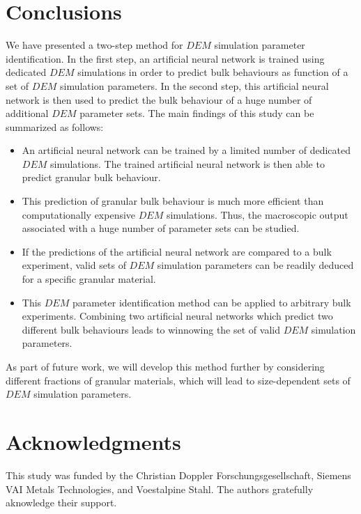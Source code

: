 \documentclass{llncs}
\begin{document}
\section{Conclusions}
\label{sec:conclusions}
We have presented a two-step method for $DEM$ simulation parameter
identification. In the first step, an artificial neural network is 
trained using dedicated $DEM$ simulations in order to predict bulk 
behaviours as function of a set of $DEM$ simulation parameters. 
In the second step, this artificial neural network is then used 
to predict the bulk behaviour of a huge number of additional $DEM$ parameter
sets.
The main findings of this study can be summarized as follows:
\begin{itemize}
  \item{An artificial neural network can be trained by a limited number of
  dedicated $DEM$ simulations.
  		The trained artificial neural network is then able to predict
  		granular bulk behaviour.}
  \item{This prediction of granular bulk behaviour is much more efficient
  		than computationally expensive $DEM$ simulations.
  		Thus, the macroscopic output associated with a huge number of parameter sets
  		can be studied.}
  \item{If the predictions of the artificial neural network are compared to a bulk experiment, 
  		valid sets of $DEM$ simulation parameters can be readily deduced for a
  		specific granular material.}
  \item{This $DEM$ parameter identification method can be applied to
  arbitrary bulk experiments.
  		Combining two artificial neural networks which predict two different bulk
  		behaviours leads to winnowing the set of valid $DEM$ simulation parameters.}
\end{itemize}
As part of future work, we will develop this method further by considering
different fractions of granular materials, which will lead to size-dependent sets of $DEM$
simulation parameters.


\section*{Acknowledgments}\label{sec:Acknowledgments}

This study was funded by the Christian Doppler Forschungsgesellschaft, Siemens
VAI Metals Technologies, and Voestalpine Stahl. The authors gratefully
aknowledge their support.
\end{document}
